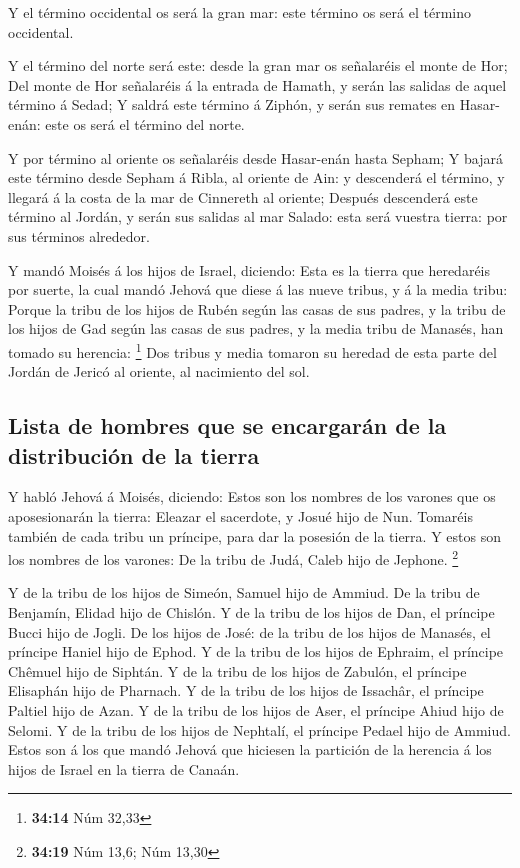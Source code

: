  Y el término occidental os será la gran mar: este término
os será el término occidental.

 Y el término del norte será este: desde la gran mar os
señalaréis el monte de Hor;  Del monte de Hor señalaréis á
la entrada de Hamath, y serán las salidas de aquel término á Sedad;
 Y saldrá este término á Ziphón, y serán sus remates en
Hasar-enán: este os será el término del norte.

 Y por término al oriente os señalaréis desde Hasar-enán
hasta Sepham;  Y bajará este término desde Sepham á Ribla,
al oriente de Ain: y descenderá el término, y llegará á la costa de la
mar de Cinnereth al oriente;  Después descenderá este
término al Jordán, y serán sus salidas al mar Salado: esta será vuestra
tierra: por sus términos alrededor.

 Y mandó Moisés á los hijos de Israel, diciendo: Esta es la
tierra que heredaréis por suerte, la cual mandó Jehová que diese á las
nueve tribus, y á la media tribu:  Porque la tribu de los
hijos de Rubén según las casas de sus padres, y la tribu de los hijos de
Gad según las casas de sus padres, y la media tribu de Manasés, han
tomado su herencia: \footnote{\textbf{34:14} Núm 32,33} 
Dos tribus y media tomaron su heredad de esta parte del Jordán de Jericó
al oriente, al nacimiento del sol.

\hypertarget{lista-de-hombres-que-se-encargaruxe1n-de-la-distribuciuxf3n-de-la-tierra}{%
\subsection{Lista de hombres que se encargarán de la distribución de la
tierra}\label{lista-de-hombres-que-se-encargaruxe1n-de-la-distribuciuxf3n-de-la-tierra}}

 Y habló Jehová á Moisés, diciendo:  Estos son
los nombres de los varones que os aposesionarán la tierra: Eleazar el
sacerdote, y Josué hijo de Nun.  Tomaréis también de cada
tribu un príncipe, para dar la posesión de la tierra.  Y
estos son los nombres de los varones: De la tribu de Judá, Caleb hijo de
Jephone. \footnote{\textbf{34:19} Núm 13,6; Núm 13,30}

 Y de la tribu de los hijos de Simeón, Samuel hijo de
Ammiud.  De la tribu de Benjamín, Elidad hijo de Chislón.
 Y de la tribu de los hijos de Dan, el príncipe Bucci hijo
de Jogli.  De los hijos de José: de la tribu de los hijos
de Manasés, el príncipe Haniel hijo de Ephod.  Y de la
tribu de los hijos de Ephraim, el príncipe Chêmuel hijo de Siphtán.
 Y de la tribu de los hijos de Zabulón, el príncipe
Elisaphán hijo de Pharnach.  Y de la tribu de los hijos de
Issachâr, el príncipe Paltiel hijo de Azan.  Y de la tribu
de los hijos de Aser, el príncipe Ahiud hijo de Selomi.  Y
de la tribu de los hijos de Nephtalí, el príncipe Pedael hijo de Ammiud.
 Estos son á los que mandó Jehová que hiciesen la partición
de la herencia á los hijos de Israel en la tierra de Canaán.

